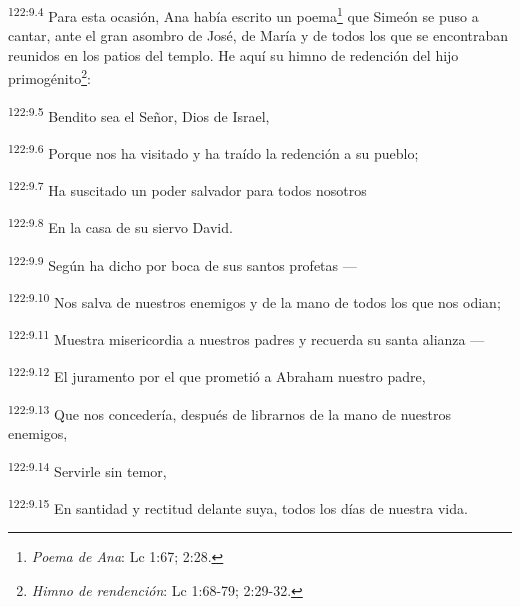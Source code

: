 \par 
\textsuperscript{122:9.4} Para esta ocasión, Ana había escrito un poema\footnote{\textit{Poema de Ana}: Lc 1:67; 2:28.} que Simeón se puso a cantar, ante el gran asombro de José, de María y de todos los que se encontraban reunidos en los patios del templo. He aquí su himno de redención del hijo primogénito\footnote{\textit{Himno de rendención}: Lc 1:68-79; 2:29-32.}:

\par 
\textsuperscript{122:9.5} Bendito sea el Señor, Dios de Israel,

\par 
\textsuperscript{122:9.6} Porque nos ha visitado y ha traído la redención a su pueblo;

\par 
\textsuperscript{122:9.7} Ha suscitado un poder salvador para todos nosotros

\par 
\textsuperscript{122:9.8} En la casa de su siervo David.

\par 
\textsuperscript{122:9.9} Según ha dicho por boca de sus santos profetas ---

\par 
\textsuperscript{122:9.10} Nos salva de nuestros enemigos y de la mano de todos los que nos odian;

\par 
\textsuperscript{122:9.11} Muestra misericordia a nuestros padres y recuerda su santa alianza ---

\par 
\textsuperscript{122:9.12} El juramento por el que prometió a Abraham nuestro padre,

\par 
\textsuperscript{122:9.13} Que nos concedería, después de librarnos de la mano de nuestros enemigos,

\par 
\textsuperscript{122:9.14} Servirle sin temor,

\par 
\textsuperscript{122:9.15} En santidad y rectitud delante suya, todos los días de nuestra vida.

